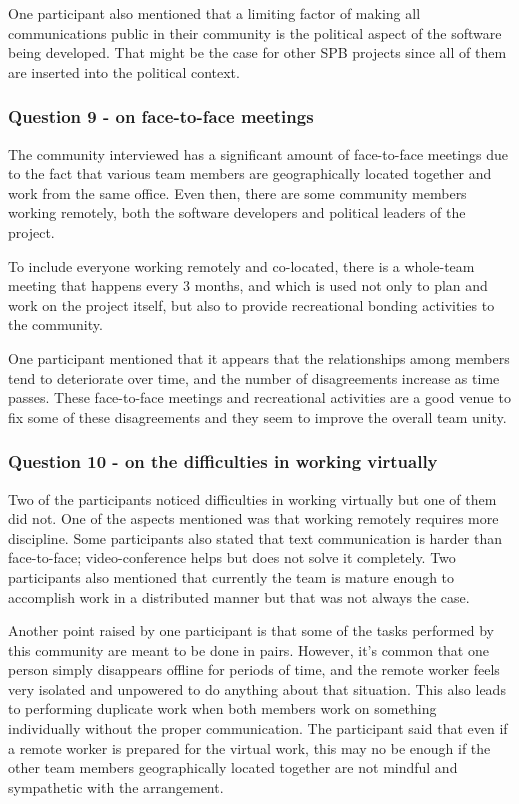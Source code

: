 \documentclass{sigchi}
\begin{document}
One participant also mentioned that a limiting factor of making all communications public in their community is the political aspect of the software being developed. That might be the case for other SPB projects since all of them are inserted into the political context.

\subsubsection{Question 9 - on face-to-face meetings}

The community interviewed has a significant amount of face-to-face meetings due to the fact that various team members are geographically located together and work from the same office. Even then, there are some community members working remotely, both the software developers and political leaders of the project.

To include everyone working remotely and co-located, there is a whole-team meeting that happens every 3 months, and which is used not only to plan and work on the project itself, but also to provide recreational bonding activities to the community. 

One participant mentioned that it appears that the relationships among members tend to deteriorate over time, and the number of disagreements increase as time passes. These face-to-face meetings and recreational activities are a good venue to fix some of these disagreements and they seem to improve the overall team unity.

\subsubsection{Question 10 - on the difficulties in working virtually}

Two of the participants noticed difficulties in working virtually but one of them did not. One of the aspects mentioned was that working remotely requires more discipline. Some participants also stated that text communication is harder than face-to-face; video-conference helps but does not solve it completely. Two participants also mentioned that currently the team is mature enough to accomplish work in a distributed manner but that was not always the case. 

Another point raised by one participant is that some of the tasks performed by this community are meant to be done in pairs. However, it's common that one person simply disappears offline for periods of time, and the remote worker feels very isolated and unpowered to do anything about that situation. This also leads to performing duplicate work when both members work on something individually without the proper communication. The participant said that even if a remote worker is prepared for the virtual work, this may no be enough if the other team members geographically located together are not mindful and sympathetic with the arrangement.
\end{document}
